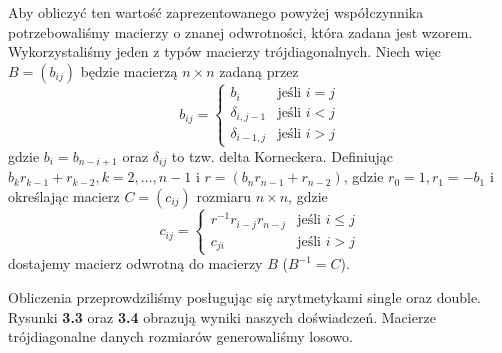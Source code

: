 Aby obliczyć ten wartość zaprezentowanego powyżej współczynnika potrzebowaliśmy macierzy o znanej odwrotności, która zadana jest wzorem. Wykorzystaliśmy jeden z typów macierzy trójdiagonalnych. Niech więc $B = (b_{ij})$ będzie macierzą $n \times n$ zadaną przez
$$b_{ij} = \left\{\begin{matrix}b_i & \mbox{jeśli } i=j \\\delta_{i, j-1} & \mbox{jeśli } i<j \\\delta_{i-1,j} & \mbox{jeśli } i>j \end{matrix}\right.$$
gdzie $b_i=b_{n-i+1}$ oraz $\delta_{ij}$ to tzw. delta Korneckera. Definiując
$b_kr_{k-1}+r_{k-2}, k = 2, ... , n-1$ i $r=(b_nr_{n-1}+r_{n-2})$, gdzie
$r_0=1, r_1=-b_1$ i określając macierz $C=(c_{ij})$ rozmiaru $n \times n$, gdzie
$$c_{ij} = \left\{\begin{matrix}r^{-1}r_{i-j}r_{n-j} & \mbox{jeśli } i \leq j  \\c_{ji} & \mbox{jeśli } i > j \end{matrix}\right.$$
dostajemy macierz odwrotną do macierzy $B$ ($B^{-1}=C$).

Obliczenia przeprowdziliśmy posługując się arytmetykami single oraz double. Rysunki \textbf{3.3} oraz \textbf{3.4} obrazują wyniki naszych doświadczeń. Macierze trójdiagonalne danych rozmiarów generowaliśmy losowo. 


